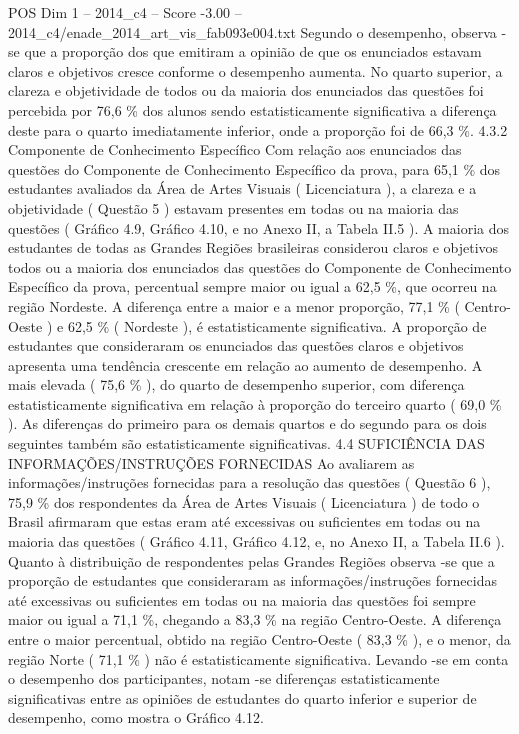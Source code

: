 \begin{textsample}{POS Dim 1 – 2014\_c4 – Score -3.00 – 2014\_c4/enade\_2014\_art\_vis\_fab093e004.txt}
Segundo o desempenho, observa -se que a proporção dos que emitiram a opinião de que os enunciados estavam claros e objetivos cresce conforme o desempenho aumenta.
No quarto superior, a clareza e objetividade de todos ou da maioria dos enunciados das questões foi percebida por 76,6 \% dos alunos sendo estatisticamente significativa a diferença deste para o quarto imediatamente inferior, onde a proporção foi de 66,3 \%. 4.3.2 Componente de Conhecimento Específico Com relação aos enunciados das questões do Componente de Conhecimento Específico da prova, para 65,1 \% dos estudantes avaliados da Área de Artes Visuais ( Licenciatura ), a clareza e a objetividade ( Questão 5 ) estavam presentes em todas ou na maioria das questões ( Gráfico 4.9, Gráfico 4.10, e no Anexo II, a Tabela II.5 ).
A maioria dos estudantes de todas as Grandes Regiões brasileiras considerou claros e objetivos todos ou a maioria dos enunciados das questões do Componente de Conhecimento Específico da prova, percentual sempre maior ou igual a 62,5 \%, que ocorreu na região Nordeste.
A diferença entre a maior e a menor proporção, 77,1 \% ( Centro-Oeste ) e 62,5 \% ( Nordeste ), é estatisticamente significativa.
A proporção de estudantes que consideraram os enunciados das questões claros e objetivos apresenta uma tendência crescente em relação ao aumento de desempenho.
A mais elevada ( 75,6 \% ), do quarto de desempenho superior, com diferença estatisticamente significativa em relação à proporção do terceiro quarto ( 69,0 \% ).
As diferenças do primeiro para os demais quartos e do segundo para os dois seguintes também são estatisticamente significativas. 4.4 SUFICIÊNCIA DAS INFORMAÇÕES/INSTRUÇÕES FORNECIDAS Ao avaliarem as informações/instruções fornecidas para a resolução das questões ( Questão 6 ), 75,9 \% dos respondentes da Área de Artes Visuais ( Licenciatura ) de todo o Brasil afirmaram que estas eram até excessivas ou suficientes em todas ou na maioria das questões ( Gráfico 4.11, Gráfico 4.12, e, no Anexo II, a Tabela II.6 ).
Quanto à distribuição de respondentes pelas Grandes Regiões observa -se que a proporção de estudantes que consideraram as informações/instruções fornecidas até excessivas ou suficientes em todas ou na maioria das questões foi sempre maior ou igual a 71,1 \%, chegando a 83,3 \% na região Centro-Oeste.
A diferença entre o maior percentual, obtido na região Centro-Oeste ( 83,3 \% ), e o menor, da região Norte ( 71,1 \% ) não é estatisticamente significativa.
Levando -se em conta o desempenho dos participantes, notam -se diferenças estatisticamente significativas entre as opiniões de estudantes do quarto inferior e superior de desempenho, como mostra o Gráfico 4.12.

\end{textsample}
